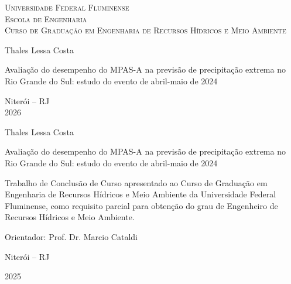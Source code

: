 \documentclass[12pt,a4paper,oneside]{book}
\begin{document}
\begin{titlepage}
\begin{center}
\Large{\textsc{Universidade Federal Fluminense}\\
\textsc{Escola de Engenharia}\\
\textsc{Curso de Graduação em Engenharia de Recursos Hídricos e Meio Ambiente}}
\par\vfill
\LARGE{Thales Lessa Costa}
\par\vfill
\LARGE{Avaliação do desempenho do MPAS-A na previsão de precipitação extrema no Rio Grande do Sul: estudo do evento de abril-maio de 2024}
\par\vfill
\Large{Niterói -- RJ\\
2026}
\end{center}
\end{titlepage}

\begin{center}
Thales Lessa Costa

\vfill

Avaliação do desempenho do MPAS-A na previsão de precipitação extrema no Rio Grande do Sul: estudo do evento de abril-maio de 2024

\vspace{3cm}

\begin{flushright}
\begin{minipage}{0.55\textwidth}
Trabalho de Conclusão de Curso apresentado ao Curso de Graduação em Engenharia de Recursos Hídricos e Meio Ambiente da Universidade Federal Fluminense, como requisito parcial para obtenção do grau de Engenheiro de Recursos Hídricos e Meio Ambiente.
\end{minipage}
\end{flushright}

\vspace{3cm}

Orientador: Prof. Dr. Marcio Cataldi


\vfill

Niterói -- RJ

2025
\end{center}
\pagebreak

\setcounter{page}{2}

\vspace*{\fill}
\begin{center}
\end{center}
\vspace*{\fill}
\clearpage
\end{document}
